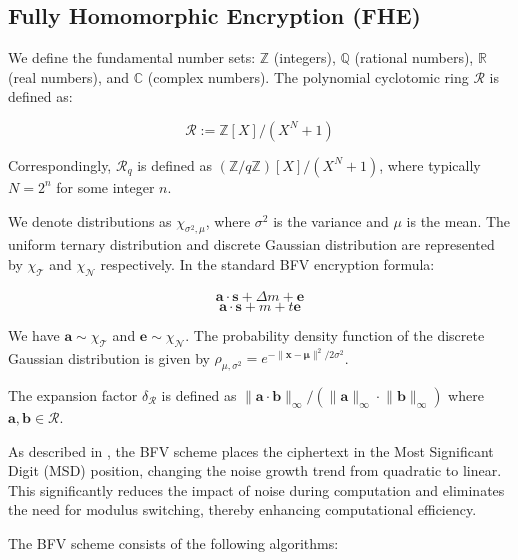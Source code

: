\documentclass[11pt]{article}
\begin{document}
\subsection{Fully Homomorphic Encryption (FHE)}
\label{sec:BFV}

We define the fundamental number sets: $\mathbb{Z}$ (integers), $\mathbb{Q}$ (rational numbers), $\mathbb{R}$ (real numbers), and $\mathbb{C}$ (complex numbers). The polynomial cyclotomic ring $\mathcal{R}$ is defined as:

$$\mathcal{R}:=\mathbb{Z}[X]/(X^N+1)$$

Correspondingly, $\mathcal{R}_q$ is defined as $(\mathbb{Z}/q\mathbb{Z})[X]/(X^N+1)$, where typically $N=2^n$ for some integer $n$.

We denote distributions as $\chi_{\sigma^2,\mu}$, where $\sigma^2$ is the variance and $\mu$ is the mean. The uniform ternary distribution and discrete Gaussian distribution are represented by $\chi_\mathcal{T}$ and $\chi_\mathcal{N}$ respectively. In the standard BFV encryption formula:

$$\mathbf{a}\cdot \mathbf{s} +\Delta m +\mathbf{e}$$
$$\mathbf{a}\cdot \mathbf{s} + m +t\mathbf{e}$$

We have $\mathbf{a}\sim\chi_\mathcal{T}$ and $\mathbf{e}\sim\chi_{\mathcal{N}}$. The probability density function of the discrete Gaussian distribution is given by $\rho_{\mu,\sigma^2}=e^{-\lVert\mathbf{x}-\mathbf{\mu}\rVert^2/2\sigma^2}$.

The expansion factor $\delta_\mathcal{R}$ is defined as $\lVert \mathbf{a}\cdot\mathbf{b}\rVert_\infty/(\lVert\mathbf{a}\rVert_\infty\cdot\lVert\mathbf{b}\rVert_\infty)$ where $\mathbf{a},\mathbf{b}\in \mathcal{R}$.

As described in \cite{10.1007/978-3-642-32009-5_50, cryptoeprint:2012/144}, the BFV scheme places the ciphertext in the Most Significant Digit (MSD) position, changing the noise growth trend from quadratic to linear. This significantly reduces the impact of noise during computation and eliminates the need for modulus switching, thereby enhancing computational efficiency.

The BFV scheme consists of the following algorithms:
\end{document}
